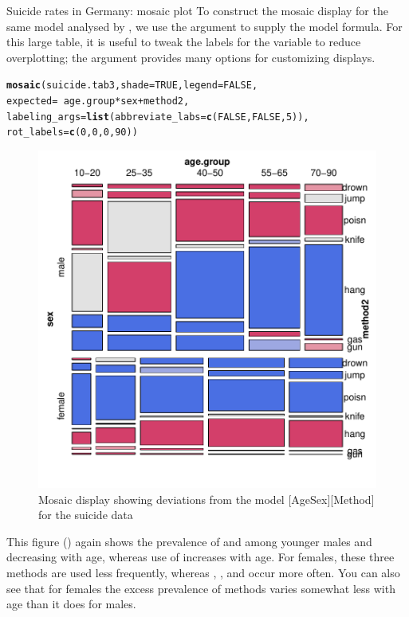 \documentclass[11pt]{book}\usepackage[]{graphicx}\usepackage[]{color}
\makeatletter
\newcommand{\hlnum}[1]{\textcolor[rgb]{0.686,0.059,0.569}{#1}}%
\newcommand{\hlopt}[1]{\textcolor[rgb]{0,0,0}{#1}}%
\newcommand{\hlstd}[1]{\textcolor[rgb]{0.345,0.345,0.345}{#1}}%
\newcommand{\hlkwc}[1]{\textcolor[rgb]{0.333,0.667,0.333}{#1}}%
\newcommand{\hlkwd}[1]{\textcolor[rgb]{0.737,0.353,0.396}{\textbf{#1}}}%
\newenvironment{kframe}{%
 \def\at@end@of@kframe{}%
 \ifinner\ifhmode%
  \def\at@end@of@kframe{\end{minipage}}%
  \begin{minipage}{\columnwidth}%
 \fi\fi%
 \def\FrameCommand##1{\hskip\@totalleftmargin \hskip-\fboxsep
 \colorbox{shadecolor}{##1}\hskip-\fboxsep
     \hskip-\linewidth \hskip-\@totalleftmargin \hskip\columnwidth}%
 \MakeFramed {\advance\hsize-\width
   \@totalleftmargin\z@ \linewidth\hsize
   \@setminipage}}%
 {\par\unskip\endMakeFramed%
 \at@end@of@kframe}
\newenvironment{knitrout}{}{} %
\renewenvironment{knitrout}{\small\renewcommand{\baselinestretch}{.85}}{} %
\makeatother
\begin{document}
\begin{Example}[suicide2]{Suicide rates in Germany: mosaic plot}
To construct the mosaic display for the same model analysed by \ca, we use the 
argument  to supply the model formula.
For this large table, it is useful to tweak the labels for the 
variable to reduce overplotting; the  argument provides
many options for customizing  displays.
\begin{knitrout}
\color{fgcolor}\begin{kframe}
\begin{alltt}
\hlkwd{mosaic}\hlstd{(suicide.tab3,} \hlkwc{shade}\hlstd{=}\hlnum{TRUE}\hlstd{,} \hlkwc{legend}\hlstd{=}\hlnum{FALSE}\hlstd{,}
       \hlkwc{expected}\hlstd{=}\hlopt{~}\hlstd{age.group}\hlopt{*}\hlstd{sex} \hlopt{+} \hlstd{method2,}
       \hlkwc{labeling_args}\hlstd{=}\hlkwd{list}\hlstd{(}\hlkwc{abbreviate_labs}\hlstd{=}\hlkwd{c}\hlstd{(}\hlnum{FALSE}\hlstd{,} \hlnum{FALSE}\hlstd{,} \hlnum{5}\hlstd{)),}
                          \hlkwc{rot_labels} \hlstd{=} \hlkwd{c}\hlstd{(}\hlnum{0}\hlstd{,} \hlnum{0}\hlstd{,} \hlnum{0}\hlstd{,} \hlnum{90}\hlstd{))}
\end{alltt}
\end{kframe}\begin{figure}[!htb]


\centerline{\includegraphics[width=.7\textwidth]{ch06/fig/ca-suicide-mosaic} }

\caption[Mosaic display showing deviations from the model AgeSex Method for the suicide data]{Mosaic display showing deviations from the model [AgeSex][Method] for the suicide data\label{fig:ca-suicide-mosaic}}
\end{figure}


\end{knitrout}

This figure ()
again shows the prevalence of  and
 among younger males and decreasing with age, whereas use of 
increases with age.  
For females, these three methods are used less
frequently, whereas , , and  occur more often.
You can also see that for females the excess prevalence of methods varies somewhat
less with age than it does for males.

\end{Example}
\end{document}
